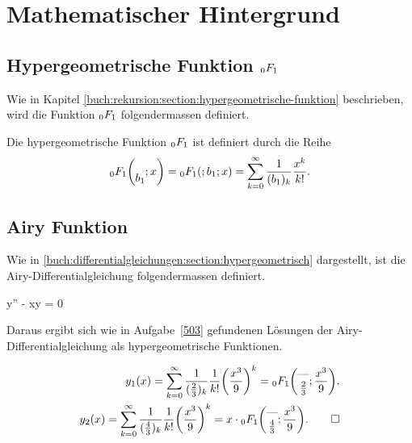 %
%
%
\section{Mathematischer Hintergrund
\label{0f1:section:mathHintergrund}}

\subsection{Hypergeometrische Funktion $\mathstrut_0F_1$
\label{0f1:subsection:0f1}}
Wie in Kapitel \ref{buch:rekursion:section:hypergeometrische-funktion} beschrieben,
wird die Funktion $\mathstrut_0F_1$ folgendermassen definiert.
\begin{definition}
    \label{0f1:rekursion:hypergeometrisch:def}
    Die hypergeometrische Funktion
    $\mathstrut_0F_1$ ist definiert durch die Reihe
    \[
    \mathstrut_0F_1
    \biggl(
    \begin{matrix}
    \\
    b_1
    \end{matrix}
    ;
    x
    \biggr)
    =
    \mathstrut_0F_1(;b_1;x)
    =
    \sum_{k=0}^\infty
    \frac{1}{(b_1)_k}\frac{x^k}{k!}.
    \]
\end{definition}


\subsection{Airy Funktion
\label{0f1:subsection:airy}}
Wie in \ref{buch:differentialgleichungen:section:hypergeometrisch} dargestellt, ist die Airy-Differentialgleichung
folgendermassen definiert.
\begin{definition}
    y'' - xy = 0
    \label{0f1:airy:eq:differentialgleichung}
\end{definition}

Daraus ergibt sich wie in Aufgabe~\ref{503} gefundenen Lösungen der
Airy-Differentialgleichung als hypergeometrische Funktionen.


\begin{align*}
y_1(x)
=
\sum_{k=0}^\infty
\frac{1}{(\frac23)_k} \frac{1}{k!}\biggl(\frac{x^3}{9}\biggr)^k
=
\mathstrut_0F_1\biggl(
\begin{matrix}\text{---}\\\frac23\end{matrix};\frac{x^3}{9}
\biggr).
\\
y_2(x)
=
\sum_{k=0}^\infty
\frac{1}{(\frac43)_k} \frac{1}{k!}\biggl(\frac{x^3}{9}\biggr)^k
=
x\cdot\mathstrut_0F_1\biggl(
\begin{matrix}\text{---}\\\frac43\end{matrix};
\frac{x^3}{9}
\biggr).
\qedhere
\end{align*}


